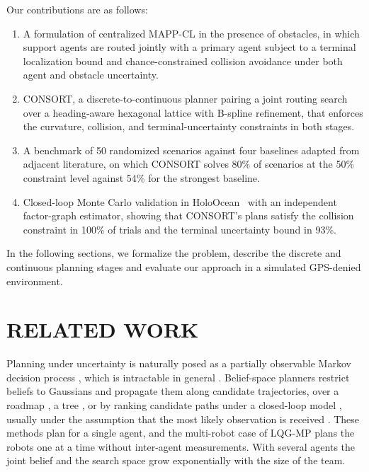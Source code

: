 \documentclass[letterpaper, 10 pt, conference]{ieeeconf}
\theoremstyle{remark}
\begin{document}
Our contributions are as follows:
\begin{enumerate}
  \item A formulation of centralized MAPP-CL in the presence of obstacles, in which support
    agents are routed jointly with a primary agent subject to a terminal
    localization bound and chance-constrained collision avoidance under both
    agent and obstacle uncertainty.
  \item CONSORT, a discrete-to-continuous planner pairing a joint routing search over a heading-aware
    hexagonal lattice with B-spline refinement, that enforces the
    curvature, collision, and terminal-uncertainty constraints in both stages.
  \item A benchmark of 50 randomized scenarios against four baselines adapted
    from adjacent literature, on which CONSORT solves 80\% of scenarios at
    the 50\% constraint level against 54\% for the strongest baseline.
  \item Closed-loop Monte Carlo validation in HoloOcean~\cite{potokar2022holoocean} with an independent
    factor-graph estimator, showing that CONSORT's plans satisfy the collision constraint in 100\% of trials and the terminal
    uncertainty bound in 93\%.
\end{enumerate}

In the following sections, we formalize the problem, describe the discrete and continuous planning stages and evaluate our approach in a simulated GPS-denied environment.


\section{RELATED WORK}
\label{sec:related}
Planning under uncertainty is naturally posed as a partially observable Markov
decision process \cite{kaelbling1998pomdp}, which is intractable in general
\cite{papadimitriou1987mdp}.
Belief-space planners restrict beliefs to Gaussians and propagate them along
candidate trajectories, over a roadmap \cite{prentice2009brm}, a tree
\cite{bry2011rrbt}, or by ranking candidate paths under a closed-loop model \cite{vandenberg2011lqgmp},
usually under the assumption that the most likely observation is received
\cite{platt2010belief}. These methods plan for a single agent, and the
multi-robot case of LQG-MP plans the robots one at a time without
inter-agent measurements. With several
agents the joint belief and the search space grow exponentially with the
size of the team.
\end{document}
